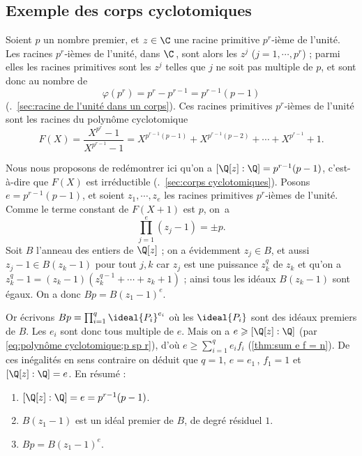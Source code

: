 \documentclass[11pt, %
  title in boldface,
  theorem in new line,
  theorem numbering = section,
  number theorems separately,
  simple name,
]{beaulivre}
\begin{document}
    \subsection*{Exemple des corps cyclotomiques}
        Soient \( p \) un nombre premier, et \( z \in \C \) une racine primitive \( p^r \)‑ième de l'unité. Les racines \( p^r \)‑ièmes de l'unité, dans \( \C \)\,, sont alors les \( z^j \) (\( j = 1, \cdots, p^r \)) ; parmi elles les racines primitives sont les \( z^j \) telles que \( j \) ne soit pas multiple de \( p \), et sont donc au nombre de
        \[
            \varphi(p^r) = p^r - p^{r-1} = p^{r-1}(p-1)
        \]
        (\cf.~\cref{sec:racine de l'unité dans un corps}). Ces racines primitives \( p^r \)‑ièmes de l'unité sont les racines du polynôme cyclotomique
        \begin{equation}\label{eq:polynôme cyclotomique;p sp r}
            F(X) = \frac{X^{p^r}-1}{X^{p^{r-1}}-1} = X^{p^{r-1}(p-1)} + X^{p^{r-1}(p-2)} + \cdots + X^{p^{r-1}} + 1.
        \end{equation}

        Nous nous proposons de redémontrer ici qu'on a \( [ \Q[z] : \Q ] = p^{r-1}(p-1) \), c'est-à-dire que \( F(X) \) est irréductible (\cf.~\cref{sec:corps cyclotomiques}). Posons \( e = p^{r-1}(p-1) \), et soient \( z_1, \cdots, z_e \) les racines primitives \( p^r \)‑ièmes de l'unité. Comme le terme constant de \( F(X+1) \) est \( p \), on~a
        \[
            \prod_{j=1}^e (z_j-1) = \pm p.
        \]
        Soit \( B \) l'anneau des entiers de \( \Q[z] \) ; on a évidemment \( z_j \in B \), et aussi \( z_j-1 \in B(z_k-1) \) pour tout \( j,k \) car \( z_j \) est une puissance \( z_k^q \) de \( z_k \) et qu'on a \( z_k^q-1 = (z_k-1)(z_k^{q-1} + \cdots + z_k + 1) \) ;  ainsi tous les idéaux \( B(z_k-1) \) sont égaux. On a donc \( B p = B(z_1-1)^e \).

        Or écrivons \( B p = \prod_{i=1}^q \ideal{P_i}^{e_i} \) où les \( \ideal{P_i} \) sont des idéaux premiers de \( B \). Les \( e_i \) sont donc tous multiple de \( e \). Mais on a \( e \geqslant [ \Q[z] : \Q ] \) (par \eqref{eq:polynôme cyclotomique;p sp r}), d'où \( e \geqslant \sum_{i=1}^q e_i f_i \) (\cref{thm:sum e f = n}). De ces inégalités en sens contraire on déduit que \( q = 1 \), \( e = e_1 \)\,, \( f_1 = 1 \) et \( [ \Q[z] : \Q ] = e \). En résumé :
        \begin{enumerate}
            \item \( [ \Q[z] : \Q ] = e = p^{r-1}(p-1) \).
            \item \( B(z_1-1) \) est un idéal premier de \( B \), de degré résiduel \( 1 \).
            \item \( Bp = B(z_1-1)^e \).
        \end{enumerate}
\end{document}
